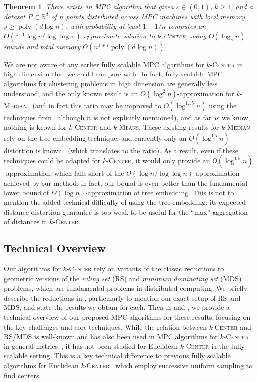 \documentclass[11pt,letterpaper]{article}
\theoremstyle{plain}
\newtheorem{theorem}{Theorem}[section]
\theoremstyle{definition}
\theoremstyle{remark}
\newcommand{\ProblemName}[1]{\textsc{#1}}
\newcommand{\kCenter}{$k$-\ProblemName{Center}\xspace}
\newcommand{\kMedian}{$k$-\ProblemName{Median}\xspace}
\newcommand{\kMeans}{$k$-\ProblemName{Means}\xspace}
\DeclareMathOperator{\poly}{poly}
\renewcommand{\epsilon}{\ensuremath{\varepsilon}}
\let\epsilon\varepsilon
\begin{document}
\begin{theorem}
\label{thm:kcenter_high_dim}
There exists an MPC algorithm that given $\varepsilon\in (0, 1)$,  $k\geq 1$, and a dataset $P\subset \mathbb{R}^{d}$ of $n$ points distributed across MPC machines with local memory $s\geq \poly(d\log n)$, with probability at least $1-1/n$ computes an $O(\epsilon^{-1}\log n/ \log \log n)$-approximate solution to \kCenter, using $O(\log_{s} n)$ rounds and total memory $O(n^{1 + \epsilon}\poly(d\log n))$.
\end{theorem}

We are not aware of any earlier fully scalable MPC algorithms for \kCenter in high dimension that we could compare with.
In fact, fully scalable MPC algorithms for clustering problems in high dimension are generally less understood,
and the only known result is an $O(\log^{2} n)$-approximation for \kMedian~\cite{Cohen-AddadLNSS21} (and in fact this ratio may be improved to $O(\log^{1,.5} n)$ using the techniques from~\cite{AhanchiAHKZ23} although it is not explicitly mentioned),
and as far as we know, nothing is known for \kCenter and \kMeans.
These existing results for \kMedian rely on the tree embedding technique,
and currently only an $O(\log^{1.5} n)$-distortion is known~\cite{AhanchiAHKZ23} (which translates to the ratio).
As a result, even if these techniques could be adapted for \kCenter,
it would only provide an $O(\log^{1.5} n)$-approximation, which falls short of the $O(\log n/ \log \log n)$-approximation achieved by our method;
in fact, our bound is even better than the fundamental lower bound of $\Omega(\log n)$-approximation of tree embedding.
This is not to mention the added technical difficulty of using the tree embedding: its expected distance distortion guarantee is too weak to be useful for the ``max'' aggregation of distances in \kCenter.


\subsection{Technical Overview}
\label{sec:tech_overview}



Our algorithms for \kCenter rely on variants of the classic reductions to geometric versions of the \emph{ruling set} (RS) and \emph{minimum dominating set} (MDS) problems,
which are fundamental problems in distributed computing.
We briefly describe the reductions in , particularly to mention our exact setup of RS and MDS, and state the results we obtain for each.
Then in  and , we provide a technical overview of our proposed MPC algorithms for these results, focusing on the key challenges and core techniques. 
While the relation between \kCenter and RS/MDS is well-known and has also been 
used in MPC algorithms for \kCenter in general metrics~\cite{HZ23,AG23}, it has not been studied for Euclidean \kCenter in the fully scalable setting.
This is a key technical difference to previous fully scalable algorithms for Euclidean \kCenter~\cite{BEFM21,CCM23} which employ successive uniform sampling to find centers. 
\end{document}

